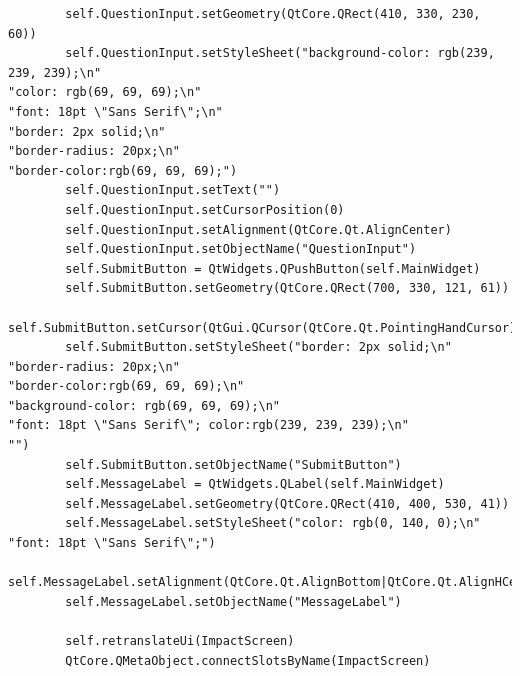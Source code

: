 \documentclass{article}
\begin{document}
\begin{lstlisting}
        self.QuestionInput.setGeometry(QtCore.QRect(410, 330, 230, 60))
        self.QuestionInput.setStyleSheet("background-color: rgb(239, 239, 239);\n"
"color: rgb(69, 69, 69);\n"
"font: 18pt \"Sans Serif\";\n"
"border: 2px solid;\n"
"border-radius: 20px;\n"
"border-color:rgb(69, 69, 69);")
        self.QuestionInput.setText("")
        self.QuestionInput.setCursorPosition(0)
        self.QuestionInput.setAlignment(QtCore.Qt.AlignCenter)
        self.QuestionInput.setObjectName("QuestionInput")
        self.SubmitButton = QtWidgets.QPushButton(self.MainWidget)
        self.SubmitButton.setGeometry(QtCore.QRect(700, 330, 121, 61))
        self.SubmitButton.setCursor(QtGui.QCursor(QtCore.Qt.PointingHandCursor))
        self.SubmitButton.setStyleSheet("border: 2px solid;\n"
"border-radius: 20px;\n"
"border-color:rgb(69, 69, 69);\n"
"background-color: rgb(69, 69, 69);\n"
"font: 18pt \"Sans Serif\"; color:rgb(239, 239, 239);\n"
"")
        self.SubmitButton.setObjectName("SubmitButton")
        self.MessageLabel = QtWidgets.QLabel(self.MainWidget)
        self.MessageLabel.setGeometry(QtCore.QRect(410, 400, 530, 41))
        self.MessageLabel.setStyleSheet("color: rgb(0, 140, 0);\n"
"font: 18pt \"Sans Serif\";")
        self.MessageLabel.setAlignment(QtCore.Qt.AlignBottom|QtCore.Qt.AlignHCenter)
        self.MessageLabel.setObjectName("MessageLabel")

        self.retranslateUi(ImpactScreen)
        QtCore.QMetaObject.connectSlotsByName(ImpactScreen)


\end{lstlisting}
\end{document}
